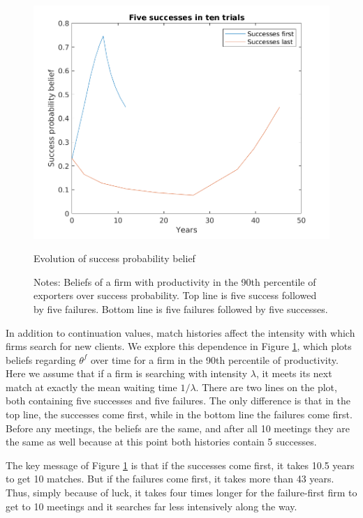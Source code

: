 \documentclass[12pt]{article}
\begin{document}
\begin{figure}
    \centering
    \includegraphics[scale=0.5]{figures/success_beliefs}
    \caption{Evolution of success probability belief}
    \label{fig:success_beliefs}
    \caption*{\small{Notes: Beliefs of a firm with productivity in the 90th percentile of exporters over success probability.  Top line is five success followed by five failures.  Bottom line is five failures followed by five successes.}}
\end{figure}

In addition to continuation values, match histories affect the intensity
with which firms search for new clients. We explore this dependence in
Figure \ref{fig:success_beliefs}, which plots beliefs regarding $\theta ^{f}$
over time for a firm in the 90th percentile of productivity. Here we assume
that if a firm is searching with intensity $\lambda $, it meets its next
match at exactly the mean waiting time $1/\lambda $. There are two lines on
the plot, both containing five successes and five failures. The only
difference is that in the top line, the successes come first, while in the
bottom line the failures come first. Before any meetings, the beliefs are
the same, and after all 10 meetings they are the same as well because at
this point both histories contain 5 successes.

The key message of Figure \ref{fig:success_beliefs} is that if the successes
come first, it takes 10.5 years to get 10 matches. But if the failures come
first, it takes more than 43 years. Thus, simply because of luck, it takes
four times longer for the failure-first firm to get to 10 meetings and it
searches far less intensively along the way.
\end{document}
